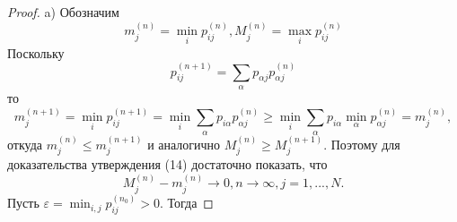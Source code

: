 \begin{proof}

a) Обозначим
\begin{equation} \label{mindiiarova_eq_16} 
      m_j^{(n)} = \min_{i}p_{ij}^{(n)}, M_j^{(n)} = \max_{i}p_{ij}^{(n)}
\end{equation}
Поскольку
\begin{equation} \label{mindiiarova_eq_17} 
      p_{ij}^{(n+1)} =  \sum\limits_{\alpha}p_{\alpha j}p_{\alpha j}^{(n)}
\end{equation}
то
\begin{equation}\label{mindiiarova_eq_18} 
      m_{j}^{(n+1)} =  \min_{i}p_{ij}^{(n+1)} =  \min_{i}\sum\limits_{\alpha}p_{i \alpha}p_{\alpha j}^{(n)} \geq \min_{i}\sum\limits_{\alpha}p_{i \alpha}\min_{\alpha}p_{\alpha j}^{(n)} = m_j^{(n)},
\end{equation}
откуда $m_j^{(n)} \leq m_j^{(n+1)}$ и аналогично $M_j^{(n)} \geq M_j^{(n+1)}$. Поэтому для доказательства утверждения (14) достаточно показать, что 
\begin{equation} \label{mindiiarova_eq_19} 
     M_j^{(n)} - m_j^{(n)} \rightarrow 0, 
     n \rightarrow \infty, j =1, ..., N.
\end{equation}
Пусть $\varepsilon = \min_{i, j}p_{ij}^{(n_0)} > 0$. Тогда


\end{proof}
